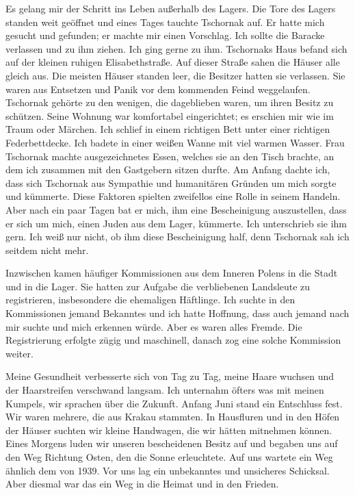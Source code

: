 \documentclass[a4paper,12pt,ngerman,
]{nisebook}
\begin{document}
Es gelang mir der Schritt ins Leben außerhalb des Lagers. Die Tore des Lagers standen weit geöffnet und eines Tages tauchte Tschornak auf. Er hatte mich gesucht und gefunden; er machte mir einen Vorschlag. Ich sollte die Baracke verlassen und zu ihm ziehen. Ich ging gerne zu ihm. Tschornaks Haus befand sich auf der kleinen ruhigen Elisabethstraße. Auf dieser Straße sahen die Häuser alle gleich aus. Die meisten Häuser standen leer, die Besitzer hatten sie verlassen. Sie waren aus Entsetzen und Panik vor dem kommenden Feind weggelaufen. Tschornak gehörte zu den wenigen, die dageblieben waren, um ihren Besitz zu schützen. Seine Wohnung war komfortabel eingerichtet; es erschien mir wie im Traum oder Märchen. Ich schlief in einem richtigen Bett unter einer richtigen Federbettdecke. Ich badete in einer weißen Wanne mit viel warmen Wasser. Frau Tschornak machte ausgezeichnetes Essen, welches sie an den Tisch brachte, an dem ich zusammen mit den Gastgebern sitzen durfte. Am Anfang dachte ich, dass sich Tschornak aus Sympathie und humanitären Gründen um mich sorgte und kümmerte. Diese Faktoren spielten zweifellos eine Rolle in seinem Handeln. Aber nach ein paar Tagen bat er mich, ihm eine Bescheinigung auszustellen, dass er sich um mich, einen Juden aus dem Lager, kümmerte. Ich unterschrieb sie ihm gern. Ich weiß nur nicht, ob ihm diese Bescheinigung half, denn Tschornak sah ich seitdem nicht mehr.

Inzwischen kamen häufiger Kommissionen aus dem Inneren Polens in die Stadt und in die Lager. Sie hatten zur Aufgabe die verbliebenen Landsleute zu registrieren, insbesondere die ehemaligen Häftlinge. Ich suchte in den Kommissionen jemand Bekanntes und ich hatte Hoffnung, dass auch jemand nach mir suchte und mich erkennen würde. Aber es waren alles Fremde. 
Die Registrierung erfolgte zügig und maschinell, danach zog eine solche Kommission weiter.

Meine Gesundheit verbesserte sich von Tag zu Tag, meine Haare wuchsen und der Haarstreifen verschwand langsam. Ich unternahm öfters was mit meinen Kumpels, wir sprachen über die Zukunft. Anfang Juni stand ein Entschluss fest. Wir waren mehrere, die aus Krakau stammten. In Hausfluren und in den Höfen der Häuser suchten wir kleine Handwagen, die wir hätten mitnehmen können. Eines Morgens luden wir unseren bescheidenen Besitz auf und begaben uns auf den Weg Richtung Osten, den die Sonne erleuchtete. Auf uns wartete ein Weg ähnlich dem von 1939. Vor uns lag ein unbekanntes und unsicheres Schicksal. Aber diesmal war das ein Weg in die Heimat und in den Frieden.~
\end{document}
